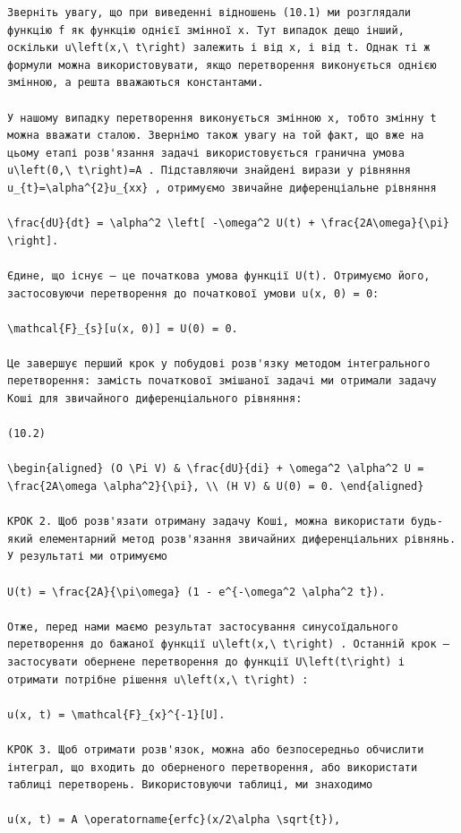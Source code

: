 \documentclass[
  ukrainian,
]{article}
\begin{document}
\begin{verbatim}
Зверніть увагу, що при виведенні відношень (10.1) ми розглядали функцію f як функцію однієї змінної x. Тут випадок дещо інший, оскільки u\left(x,\ t\right) залежить і від x, і від t. Однак ті ж формули можна використовувати, якщо перетворення виконується однією змінною, а решта вважаються константами.

У нашому випадку перетворення виконується змінною x, тобто змінну t можна вважати сталою. Звернімо також увагу на той факт, що вже на цьому етапі розв'язання задачі використовується гранична умова u\left(0,\ t\right)=A . Підставляючи знайдені вирази у рівняння u_{t}=\alpha^{2}u_{xx} , отримуємо звичайне диференціальне рівняння

\frac{dU}{dt} = \alpha^2 \left[ -\omega^2 U(t) + \frac{2A\omega}{\pi} \right].

Єдине, що існує — це початкова умова функції U(t). Отримуємо його, застосовуючи перетворення до початкової умови u(x, 0) = 0:

\mathcal{F}_{s}[u(x, 0)] = U(0) = 0.

Це завершує перший крок у побудові розв'язку методом інтегрального перетворення: замість початкової змішаної задачі ми отримали задачу Коші для звичайного диференціального рівняння:

(10.2)

\begin{aligned} (O \Pi V) & \frac{dU}{di} + \omega^2 \alpha^2 U = \frac{2A\omega \alpha^2}{\pi}, \\ (H V) & U(0) = 0. \end{aligned}

КРОК 2. Щоб розв'язати отриману задачу Коші, можна використати будь-який елементарний метод розв'язання звичайних диференціальних рівнянь. У результаті ми отримуємо

U(t) = \frac{2A}{\pi\omega} (1 - e^{-\omega^2 \alpha^2 t}).

Отже, перед нами маємо результат застосування синусоїдального перетворення до бажаної функції u\left(x,\ t\right) . Останній крок — застосувати обернене перетворення до функції U\left(t\right) і отримати потрібне рішення u\left(x,\ t\right) :

u(x, t) = \mathcal{F}_{x}^{-1}[U].

КРОК 3. Щоб отримати розв'язок, можна або безпосередньо обчислити інтеграл, що входить до оберненого перетворення, або використати таблиці перетворень. Використовуючи таблиці, ми знаходимо

u(x, t) = A \operatorname{erfc}(x/2\alpha \sqrt{t}),


\end{verbatim}
\end{document}
